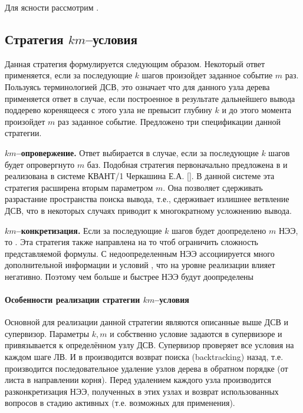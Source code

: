 Для ясности рассмотрим .

\subsection{Стратегия $km$--условия}
Данная стратегия формулируется следующим образом. Некоторый ответ применяется, если за последующие $k$ шагов произойдет заданное событие $m$ раз. Пользуясь терминологией ДСВ, это означает что для данного узла дерева применяется ответ в случае, если построенное в результате дальнейшего вывода поддерево коренящееся с этого узла не превысит глубину $k$ и до этого момента произойдет $m$ раз заданное событие. Предложено три спецификации данной стратегии.

\textbf{$km$--опровержение.} Ответ выбирается в случае, если за последующие $k$ шагов будет опровергнуто $m$ баз. Подобная стратегия первоначально предложена в \cite{ICDS2000} и реализована в системе КВАНТ/1 Черкашина Е.А. []. В данной системе эта стратегия расширена вторым параметром $m$. Она позволяет сдерживать разрастание пространства поиска вывода, т.е., сдерживает излишнее ветвление ДСВ, что в некоторых случаях приводит к многократному усложнению вывода.

\textbf{$km$--конкретизация.} Если за последующие $k$ шагов будет доопределено $m$ НЭЭ, то . Эта стратегия также направлена на то чтоб ограничить сложность представляемой формулы. С недоопределенным НЭЭ ассоциируется много дополнительной информации и условий , что на уровне реализации влияет негативно. Поэтому чем больше и быстрее НЭЭ будут доопределены 

\paragraph{Особенности реализации стратегии $km$--условия}
Основной для реализации данной стратегии являются описанные выше ДСВ и супервизор. Параметры $k,m$ и собственно условие задаются в супервизоре и привязывается к определённом узлу ДСВ. Супервизор проверяет все условия на каждом шаге ЛВ. И в  производится возврат поиска (backtracking) назад, т.е. производится последовательное удаление узлов дерева в обратном порядке (от листа в направлении корня). Перед удалением каждого узла производится разконкретизация НЭЭ, полученных в этих узлах и возврат использованных вопросов в стадию активных (т.е. возможных для применения).

